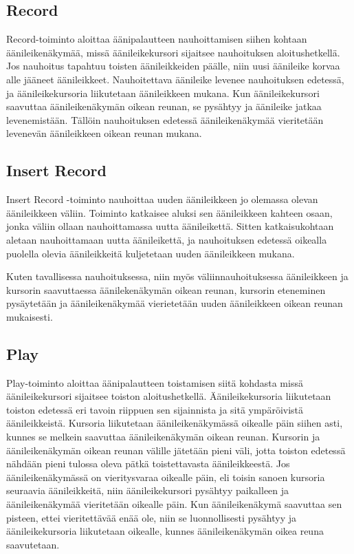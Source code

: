 \documentclass[utf8]{gradu3}
\begin{document}
\subsection{Record}

Record-toiminto aloittaa äänipalautteen nauhoittamisen siihen kohtaan äänileikenäkymää, missä äänileikekursori sijaitsee nauhoituksen aloitushetkellä. Jos nauhoitus tapahtuu toisten äänileikkeiden päälle, niin uusi äänileike korvaa alle jääneet äänileikkeet. Nauhoitettava äänileike levenee nauhoituksen edetessä, ja äänileikekursoria liikutetaan äänileikkeen mukana. Kun äänileikekursori saavuttaa äänileikenäkymän oikean reunan, se pysähtyy ja äänileike jatkaa levenemistään. Tällöin nauhoituksen edetessä äänileikenäkymää vieritetään levenevän äänileikkeen oikean reunan mukana.

\subsection{Insert Record}

Insert Record -toiminto nauhoittaa uuden äänileikkeen jo olemassa olevan äänileikkeen väliin. Toiminto katkaisee aluksi sen äänileikkeen kahteen osaan, jonka väliin ollaan nauhoittamassa uutta äänileikettä. Sitten katkaisukohtaan aletaan nauhoittamaan uutta äänileikettä, ja nauhoituksen edetessä oikealla puolella olevia äänileikkeitä kuljetetaan uuden äänileikkeen mukana. 

Kuten tavallisessa nauhoituksessa, niin myös väliinnauhoituksessa äänileikkeen ja kursorin saavuttaessa äänilekenäkymän oikean reunan, kursorin eteneminen pysäytetään ja äänileikenäkymää vierietetään uuden äänileikkeen oikean reunan mukaisesti.

\subsection{Play}

Play-toiminto aloittaa äänipalautteen toistamisen siitä kohdasta missä äänileikekursori sijaitsee toiston aloitushetkellä. Äänileikekursoria liikutetaan toiston edetessä eri tavoin riippuen sen sijainnista ja sitä ympäröivistä äänileikkeistä. Kursoria liikutetaan äänileikenäkymässä oikealle päin siihen asti, kunnes se melkein saavuttaa äänileikenäkymän oikean reunan. Kursorin ja äänileikenäkymän oikean reunan välille jätetään pieni väli, jotta toiston edetessä nähdään pieni tulossa oleva pätkä toistettavasta äänileikkeestä. Jos äänileikenäkymässä on vieritysvaraa oikealle päin, eli toisin sanoen kursoria seuraavia äänileikkeitä, niin äänileikekursori pysähtyy paikalleen ja äänileikenäkymää vieritetään oikealle päin. Kun äänileikenäkymä saavuttaa sen pisteen, ettei vieritettävää enää ole, niin se luonnollisesti pysähtyy ja äänileikekursoria liikutetaan oikealle, kunnes äänileikenäkymän oikea reuna saavutetaan.
 
\end{document}
